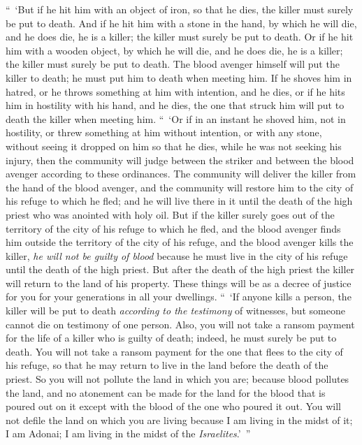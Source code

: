 \begin{biblechapter}
\verse “ ‘But if he hit him with an object of iron, so that he dies, the killer must surely be put to death.
\verse And if he hit him with a stone in the hand, by which he will die, and he does die, he is a killer; the killer must surely be put to death.
\verse Or if he hit him with a wooden object, by which he will die, and he does die, he is a killer; the killer must surely be put to death.
\verse The blood avenger himself will put the killer to death; he must put him to death when meeting him.
\verse If he shoves him in hatred, or he throws something at him with intention, and he dies,
\verse or if he hits him in hostility with his hand, and he dies, the one that struck him will put to death the killer when meeting him.
\verse “ ‘Or if in an instant he shoved him, not in hostility, or threw something at him without intention,
\verse or with any stone, without seeing it dropped on him so that he dies, while he was not seeking his injury,
\verse then the community will judge between the striker and between the blood avenger according to these ordinances.
\verse The community will deliver the killer from the hand of the blood avenger, and the community will restore him to the city of his refuge to which he fled; and he will live there in it until the death of the high priest who was anointed with holy oil.
\verse But if the killer surely goes out of the territory of the city of his refuge to which he fled,
\verse and the blood avenger finds him outside the territory of the city of his refuge, and the blood avenger kills the killer, \textit{he will not be guilty of blood}
\verse because he must live in the city of his refuge until the death of the high priest. But after the death of the high priest the killer will return to the land of his property.
\verse These things will be as a decree of justice for you for your generations in all your dwellings.
\verse “ ‘If anyone kills a person, the killer will be put to death \textit{according to the testimony} of witnesses, but someone cannot die on testimony of one person.
\verse Also, you will not take a ransom payment for the life of a killer who is guilty of death; indeed, he must surely be put to death.
\verse You will not take a ransom payment for the one that flees to the city of his refuge, so that he may return to live in the land before the death of the priest.
\verse So you will not pollute the land in which you are; because blood pollutes the land, and no atonement can be made for the land for the blood that is poured out on it except with the blood of the one who poured it out.
\verse You will not defile the land on which you are living because I am living in the midst of it; I am Adonai; I am living in the midst of the \textit{Israelites}.’ ”
\end{biblechapter}

